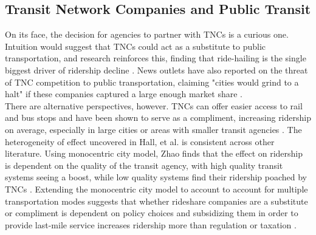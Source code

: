 \documentclass [12pt]{report}
\begin{document}
\subsection*{Transit Network Companies and Public Transit}
On its face, the decision for agencies to partner with TNCs is a curious one. Intuition would suggest that TNCs could act as a substitute to public transportation, and research reinforces this, finding that ride-hailing is the single biggest driver of ridership decline \parencite{erhardt22}. News outlets have also reported on the threat of TNC competition to public transportation, claiming "cities would grind to a halt" if these companies captured a large enough market share \parencite{mcfarlandcnn}.\\
\indent There are alternative perspectives, however. TNCs can offer easier access to rail and bus stops and have been shown to serve as a compliment, increasing ridership on average, especially in large cities or areas with smaller transit agencies \parencite{Hall2018}. The heterogeneity of effect uncovered in Hall, et al. is consistent across other literature. Using monocentric city model, Zhao finds that the effect on ridership is dependent on the quality of the transit agency, with high quality transit systems seeing a boost, while low quality systems find their ridership poached by TNCs \parencite{zhao19}. Extending the monocentric city model to account to account for multiple transportation modes suggests that whether rideshare companies are a substitute or compliment is dependent on policy choices and subsidizing them in order to provide last-mile service increases ridership more than regulation or taxation \parencite{agrawal23}.\\

\end{document}
